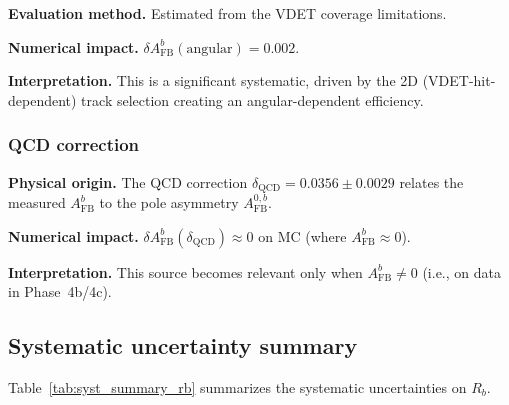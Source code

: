\documentclass[11pt,a4paper]{article}
\begin{document}
\textbf{Evaluation method.} Estimated from the VDET coverage limitations.

\textbf{Numerical impact.}
$\delta A_\mathrm{FB}^b(\mathrm{angular}) = 0.002$.

\textbf{Interpretation.} This is a significant systematic, driven by the 2D (VDET-hit-dependent)
track selection creating an angular-dependent efficiency.

\subsubsection{QCD correction}
\label{sec:syst_qcd}

\textbf{Physical origin.} The QCD correction $\delta_\mathrm{QCD} = 0.0356 \pm 0.0029$
relates the measured $A_\mathrm{FB}^b$ to the pole asymmetry $A_\mathrm{FB}^{0,b}$.

\textbf{Numerical impact.}
$\delta A_\mathrm{FB}^b(\delta_\mathrm{QCD}) \approx 0$ on MC (where $A_\mathrm{FB}^b \approx 0$).

\textbf{Interpretation.} This source becomes relevant only when $A_\mathrm{FB}^b \neq 0$
(i.e., on data in Phase~4b/4c).

\subsection{Systematic uncertainty summary}
\label{sec:syst_summary}

Table~\ref{tab:syst_summary_rb} summarizes the systematic uncertainties on $R_b$.
\end{document}
